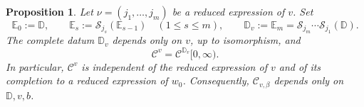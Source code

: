 \documentclass[12pt, reqno]{amsart}
\theoremstyle{plain}
\newtheorem{proposition}[theorem]{Proposition}
\theoremstyle{definition}
\numberwithin{equation}{section}
\newcommand{\DD}{\mathbb{D}}
\begin{document}
\begin{proposition}\label{prop:categorical-tail-intrinsic}
Let \(\nu=(j_1,\ldots,j_m)\) be a reduced expression of \(v\). Set
\[
\mathbb E_0:=\DD,\qquad
\mathbb E_s:=\mathscr S_{j_s}(\mathbb E_{s-1})\quad(1\le s\le m),
\qquad
\DD_v:=\mathbb E_m
=\mathscr S_{j_m}\cdots\mathscr S_{j_1}(\DD).
\]
The complete datum \(\DD_v\) depends only on \(v\), up to isomorphism,
and
\begin{equation}\label{eq:categorical-tail-intrinsic}
\mathscr C^v=\mathscr C^{\DD_v}[0,\infty).
\end{equation}
In particular, \(\mathscr C^v\) is independent of the reduced expression
of \(v\) and of its completion to a reduced expression of \(w_0\).
Consequently, \(\mathscr C_{v,\beta}\) depends only on \(\DD,v,b\).
\end{proposition}
\end{document}
